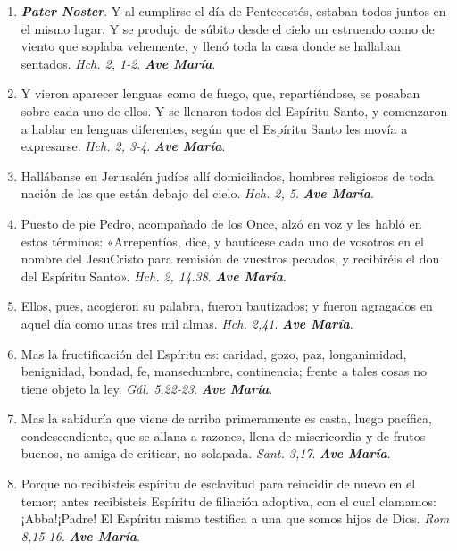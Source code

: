 \documentclass[../../devocionario.tex]{subfiles}
\begin{document}
    \begin{enumerate}
    
        \item \textbf{\textit{Pater Noster}}. Y al cumplirse el día de Pentecostés, estaban todos juntos en el mismo lugar. 
            Y se produjo de súbito desde el cielo un estruendo como de viento que soplaba vehemente, 
            y llenó toda la casa donde se hallaban sentados. \textit{Hch. 2, 1-2}. \textbf{\textit{Ave María}}.

        \item Y vieron aparecer lenguas como de fuego, que, repartiéndose, se posaban sobre cada uno de ellos. 
            Y se llenaron todos del Espíritu Santo, y comenzaron a hablar en lenguas diferentes, 
            según que el Espíritu Santo les movía a expresarse. \textit{Hch. 2, 3-4}. \textbf{\textit{Ave María}}.

        \item Hallábanse en Jerusalén judíos allí domiciliados, hombres religiosos de toda nación de las que están debajo del cielo. \textit{Hch. 2, 5}. \textbf{\textit{Ave María}}.

        \item Puesto de pie Pedro, acompañado de los Once, alzó en voz y les habló en estos términos: 
            «Arrepentíos, dice, y bautícese cada uno de vosotros en el nombre del JesuCristo para remisión de vuestros pecados, 
            y recibiréis el don del Espíritu Santo». \textit{Hch. 2, 14.38}. \textbf{\textit{Ave María}}.

        \item Ellos, pues, acogieron su palabra, fueron bautizados; y fueron agragados en aquel día como unas tres mil almas. \textit{Hch. 2,41}. \textbf{\textit{Ave María}}.

        \item Mas la fructificación del Espíritu es: caridad, gozo, paz, longanimidad, benignidad, 
            bondad, fe, mansedumbre, continencia; frente a tales cosas no tiene objeto la ley. \textit{Gál. 5,22-23}. \textbf{\textit{Ave María}}.

        \item Mas la sabiduría que viene de arriba primeramente es casta, luego pacífica, condescendiente, 
            que se allana a razones, llena de misericordia y de frutos buenos, 
            no amiga de criticar, no solapada. \textit{Sant. 3,17}. \textbf{\textit{Ave María}}.

        \item Porque no recibisteis espíritu de esclavitud para reincidir de nuevo en el temor; antes recibisteis Espíritu de filiación adoptiva, con el cual clamamos: ¡Abba!¡Padre! 
            El Espíritu mismo testifica a una que somos hijos de Dios. \textit{Rom 8,15-16}. \textbf{\textit{Ave María}}.


\end{enumerate}
\end{document}
